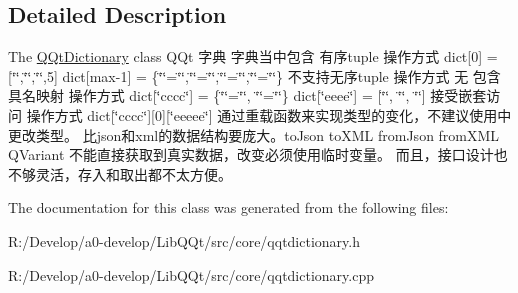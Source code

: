 \subsection{Detailed Description}
The \mbox{\hyperlink{class_q_qt_dictionary}{Q\+Qt\+Dictionary}} class Q\+Qt 字典 字典当中包含 有序tuple 操作方式 dict\mbox{[}0\mbox{]} = \mbox{[}\char`\"{}\char`\"{},\char`\"{}\char`\"{},\char`\"{}\char`\"{},5\mbox{]} dict\mbox{[}max-\/1\mbox{]} = \{\char`\"{}\char`\"{}=\char`\"{}\char`\"{},\char`\"{}\char`\"{}=\char`\"{}\char`\"{},\char`\"{}\char`\"{}=\char`\"{}\char`\"{},\char`\"{}\char`\"{}=\char`\"{}\char`\"{}\} 不支持无序tuple 操作方式 无 包含具名映射 操作方式 dict\mbox{[}\char`\"{}cccc\char`\"{}\mbox{]} = \{\char`\"{}\char`\"{}=\char`\"{}\char`\"{}, \char`\"{}\char`\"{}=\char`\"{}\char`\"{}\} dict\mbox{[}\char`\"{}eeee\char`\"{}\mbox{]} = \mbox{[}\char`\"{}\char`\"{}, \char`\"{}\char`\"{}, \char`\"{}\char`\"{}\mbox{]} 接受嵌套访问 操作方式 dict\mbox{[}\char`\"{}cccc\char`\"{}\mbox{]}\mbox{[}0\mbox{]}\mbox{[}\char`\"{}eeeee\char`\"{}\mbox{]} 通过重载函数来实现类型的变化，不建议使用中更改类型。 比json和xml的数据结构要庞大。to\+Json to\+X\+ML from\+Json from\+X\+ML Q\+Variant 不能直接获取到真实数据，改变必须使用临时变量。 而且，接口设计也不够灵活，存入和取出都不太方便。 

The documentation for this class was generated from the following files\+:\begin{DoxyCompactItemize}
\item 
R\+:/\+Develop/a0-\/develop/\+Lib\+Q\+Qt/src/core/qqtdictionary.\+h\item 
R\+:/\+Develop/a0-\/develop/\+Lib\+Q\+Qt/src/core/qqtdictionary.\+cpp\end{DoxyCompactItemize}
